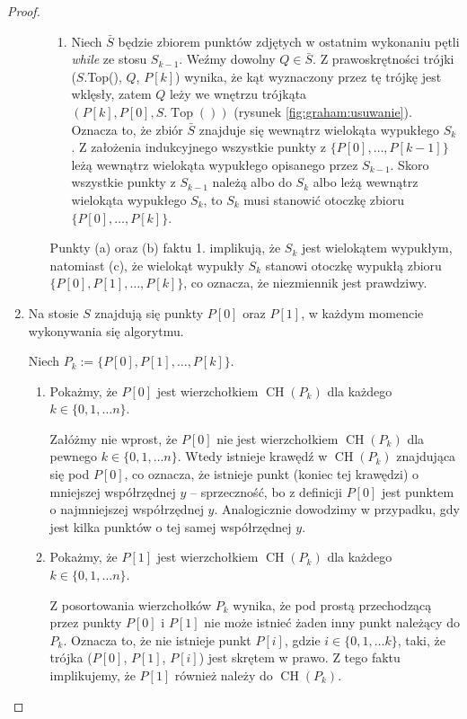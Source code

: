 \begin{theorem}
\begin{proof}
\begin{enumerate}
\begin{itemize}
\begin{enumerate}
					\item Niech $\bar{S}$ będzie zbiorem punktów zdjętych w ostatnim wykonaniu pętli \textit{while} ze stosu $S_{k-1}$.
					Weźmy dowolny $Q \in \bar{S}$. Z prawoskrętności trójki ($S$.Top(), $Q$, $P[k]$) wynika, że kąt wyznaczony przez tę trójkę jest wklęsły, zatem $Q$ leży we wnętrzu trójkąta $(P[k], P[0], S.\operatorname{Top}())$ (rysunek \ref{fig:graham:usuwanie}). Oznacza to, że zbiór $\bar{S}$
					 znajduje się wewnątrz wielokąta wypukłego $S_k$. Z założenia indukcyjnego wszystkie punkty z $\{P[0], \dots, P[k-1]\}$ leżą wewnątrz wielokąta wypukłego opisanego przez $S_{k-1}$.
					 Skoro wszystkie punkty z $S_{k-1}$ należą albo do $S_k$
					 albo leżą wewnątrz wielokąta wypukłego $S_k$, to $S_k$ musi stanowić otoczkę zbioru $\{P[0], \dots, P[k]\}$.
					 
				\end{enumerate}	
				Punkty (a) oraz (b) faktu 1. implikują, że $S_k$ jest wielokątem wypukłym, natomiast (c), że wielokąt wypukły $S_k$ stanowi otoczkę wypukłą
				zbioru \linebreak $\{P[0], P[1], \ldots, P[k]\}$, co oznacza, że niezmiennik 
				jest prawdziwy.			
			\end{itemize}
			
			
			\item Na stosie $S$ znajdują się punkty $P[0]$ oraz $P[1]$, w każdym
			momencie wykonywania się algorytmu.
			
			Niech $P_k := \{P[0], P[1], \ldots, P[k]\}$.
			
			\begin{enumerate}
				\item Pokażmy, że $P[0]$ jest wierzchołkiem $\operatorname{CH}(P_k)$ dla każdego $k \in \{0, 1, \ldots n\}$.
				
				Załóżmy nie wprost, że $P[0]$ nie jest wierzchołkiem $\operatorname{CH}(P_k)$ dla pewnego 
				$k \in \{0, 1, \ldots n\}$. Wtedy istnieje krawędź
				w $\operatorname{CH}(P_k)$ znajdująca się pod $P[0]$, co oznacza, że istnieje punkt (koniec tej krawędzi) o mniejszej współrzędnej $y$ -- sprzeczność, bo z definicji $P[0]$ jest punktem o najmniejszej współrzędnej $y$. Analogicznie dowodzimy w przypadku, gdy jest kilka punktów o tej samej współrzędnej $y$. 
				
				\item Pokażmy, że $P[1]$ jest wierzchołkiem $\operatorname{CH}(P_k)$ dla każdego $k \in \{0, 1, \ldots n\}$.
				
				Z posortowania wierzchołków $P_k$ wynika, że pod prostą przechodzącą przez punkty $P[0]$ i $P[1]$ nie może istnieć 
				żaden inny punkt należący do $P_k$. Oznacza to, że nie istnieje punkt $P[i]$, gdzie $i \in \{0, 1, \ldots k\}$, taki, że 
				trójka ($P[0]$, $P[1]$, $P[i]$) jest skrętem w prawo. Z tego faktu implikujemy, że $P[1]$ również należy do $\operatorname{CH}(P_k)$.
				

\end{enumerate}
\end{enumerate}
\end{proof}
\end{theorem}

